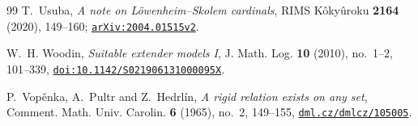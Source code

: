 \documentclass[11pt,a4paper]{amsart}
\theoremstyle{plain}
\theoremstyle{definition}
\theoremstyle{remark}
\begin{document}
\begin{thebibliography}{99}
T.~Usuba,
\emph{A note on L\"owenheim--Skolem cardinals},
RIMS K\^oky\^uroku \textbf{2164} (2020), 149--160;
\href{https://arxiv.org/abs/2004.01515}{\nolinkurl{arXiv:2004.01515v2}}.

W.~H. Woodin,
\emph{Suitable extender models I},
J. Math. Log. \textbf{10} (2010), no.~1--2, 101--339,
\href{https://doi.org/10.1142/S021906131000095X}{\nolinkurl{doi:10.1142/S021906131000095X}}.

P.~Vop\v{e}nka, A.~Pultr and Z.~Hedrl\'in,
\emph{A rigid relation exists on any set},
Comment. Math. Univ. Carolin. \textbf{6} (1965), no.~2, 149--155,
\href{https://dml.cz/dmlcz/105005}{\nolinkurl{dml.cz/dmlcz/105005}}.

\end{thebibliography}
\end{document}
